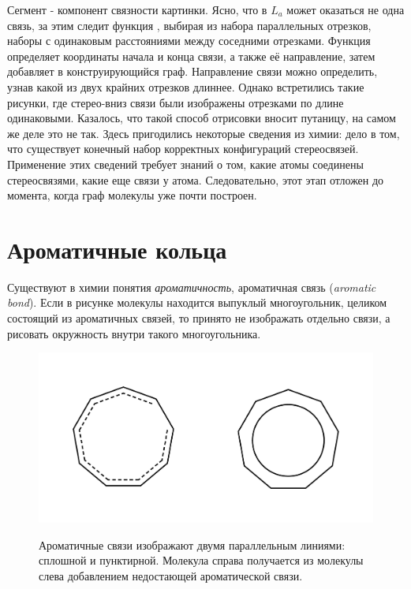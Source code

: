 \noindent
Сегмент - компонент связности картинки. Ясно, что в $L_{a}$ может оказаться не одна связь, за этим следит функция , выбирая
из набора параллельных отрезков, наборы с одинаковым расстояниями между соседними отрезками. Функция  определяет
координаты начала и конца связи, а также её направление, затем добавляет в конструирующийся граф. Направление связи можно определить, узнав
какой из двух крайних отрезков длиннее. Однако встретились такие рисунки, где стерео-вниз связи были изображены отрезками по длине одинаковыми.
Казалось, что такой способ отрисовки вносит путаницу, на самом же деле это не так. Здесь пригодились некоторые сведения из химии: дело в том, что
существует конечный набор корректных конфигураций стереосвязей. Применение этих сведений требует знаний о том, какие атомы соединены стереосвязями,
какие еще связи у атома. Следовательно, этот этап отложен до момента, когда граф молекулы уже почти построен.  


\section*{Ароматичные кольца}

Существуют в химии понятия \emph{ароматичность}, ароматичная связь (\emph{aromatic bond}). Если в рисунке молекулы находится выпуклый 
многоугольник, целиком состоящий из ароматичных связей, то принято не изображать отдельно связи, а рисовать окружность внутри такого многоугольника.

\begin{figure}[h]
\centering
{\includegraphics[scale=0.4, clip, trim = 32mm 32mm 35mm 35mm]{img/rings.pdf}}
\caption{Ароматичные связи изображают двумя параллельным линиями: сплошной и пунктирной. Молекула справа получается из молекулы слева добавлением
недостающей ароматической связи.}
\end{figure}

